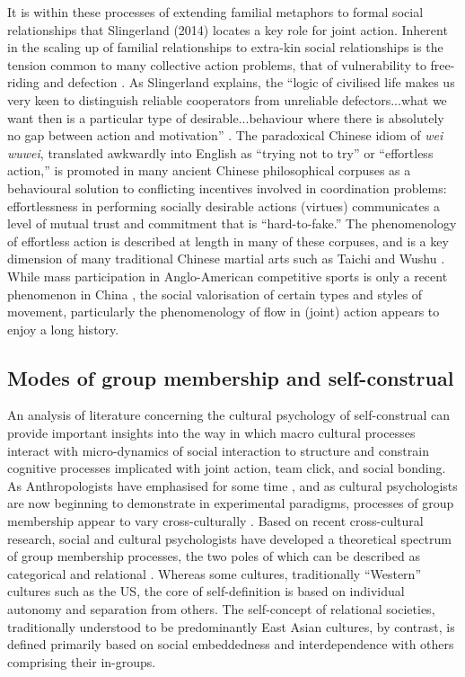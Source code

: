 It is within these processes of extending familial metaphors to formal social relationships that Slingerland (2014) locates a key role for joint action. Inherent in the scaling up of familial relationships to extra-kin social relationships is the tension common to many collective action problems, that of vulnerability to free-riding and defection \citep{Cosmides2013,Gavrilets2015}.
As Slingerland explains, the ``logic of civilised life makes us very keen to distinguish reliable cooperators from unreliable defectors...what we want then is a particular type of desirable...behaviour where there is absolutely no gap between action and motivation'' \citep[192]{Slingerland2014}. The paradoxical Chinese idiom of \textit{wei wuwei}, translated awkwardly into English as ``trying not to try'' or ``effortless action,'' is promoted in many ancient Chinese philosophical corpuses as a behavioural solution to conflicting incentives involved in coordination problems: effortlessness in performing socially desirable actions (virtues) communicates a level of mutual trust and commitment that is ``hard-to-fake.''  The phenomenology of effortless action is described at length in many of these corpuses, and is a key dimension of many traditional Chinese martial arts such as Taichi and Wushu \citep{Morris1998}.
While mass participation in Anglo-American competitive sports is only a recent phenomenon in China \citep{Brownell2008}, the social valorisation of certain types and styles of movement, particularly the phenomenology of flow in (joint) action appears to enjoy a long history.


\subsection{Modes of group membership and self-construal}
An analysis of literature concerning the cultural psychology of self-construal can provide important insights into the way in which macro cultural processes interact with micro-dynamics of social interaction to structure and constrain cognitive processes implicated with joint action, team click, and social bonding.  As Anthropologists have emphasised for some time \citep{Strodtbeck1961,Kluckhohn1961,Mead1967,Fei1992}, and as cultural psychologists are now beginning to demonstrate in experimental paradigms, processes of group membership appear to vary cross-culturally \citep{Markus1991,Nisbett2001}.  Based on recent cross-cultural research, social and cultural psychologists have developed a theoretical spectrum of group membership processes, the two poles of which can be described as categorical and relational \citep{Hofstede1980,Brewer2007}.  Whereas some cultures, traditionally ``Western'' cultures such as the US, the core of self-definition is based on individual autonomy and separation from others.
The self-concept of relational societies, traditionally understood to be predominantly East Asian cultures, by contrast, is defined primarily based on social embeddedness and interdependence with others comprising their in-groups\citep{Leung2012}.

